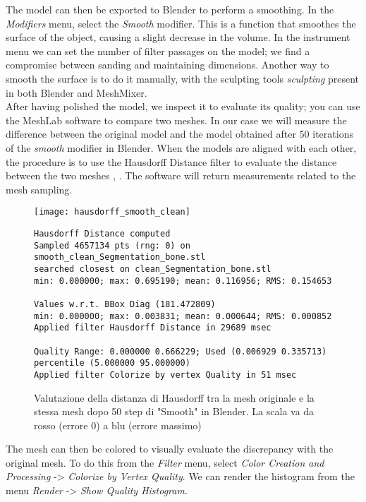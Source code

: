 The model can then be exported to Blender to perform a smoothing. In the \emph{Modifiers} menu, select the \emph{Smooth} modifier. This is a function that smoothes the surface of the object, causing a slight decrease in the volume. In the instrument menu we can set the number of filter passages on the model; we find a compromise between sanding and maintaining dimensions. Another way to smooth the surface is to do it manually, with the sculpting tools \emph{sculpting} present in both Blender and MeshMixer. \\
After having polished the model, we inspect it to evaluate its quality; you can use the MeshLab software to compare two meshes. In our case we will measure the difference between the original model and the model obtained after 50 iterations of the \emph{smooth} modifier in Blender. When the models are aligned with each other, the procedure is to use the Hausdorff Distance filter to evaluate the distance between the two meshes \parencite{Reference90}, \parencite{Reference91}. The software will return measurements related to the mesh sampling. \\
\begin{figure}[h]
\centering
\texttt{[image: hausdorff\_smooth\_clean]}
\caption[LoF entry]{Valutazione della distanza di Hausdorff tra la mesh originale e la stessa mesh dopo 50 step di "Smooth" in Blender. La scala va da rosso (errore 0) a blu (errore massimo)}

\begin{lstlisting}
Hausdorff Distance computed
Sampled 4657134 pts (rng: 0) on smooth_clean_Segmentation_bone.stl
searched closest on clean_Segmentation_bone.stl
min: 0.000000; max: 0.695190; mean: 0.116956; RMS: 0.154653

Values w.r.t. BBox Diag (181.472809)
min: 0.000000; max: 0.003831; mean: 0.000644; RMS: 0.000852 
Applied filter Hausdorff Distance in 29689 msec

Quality Range: 0.000000 0.666229; Used (0.006929 0.335713)
percentile (5.000000 95.000000) 
Applied filter Colorize by vertex Quality in 51 msec
\end{lstlisting}
\label{fig:hausdorff_smooth_clean}
\end{figure}
The mesh can then be colored to visually evaluate the discrepancy with the original mesh. To do this from the \emph{Filter} menu, select \emph{Color Creation and Processing} -> \emph{Colorize by Vertex Quality}. We can render the histogram from the menu \emph{Render} -> \emph{Show Quality Histogram}. \\
